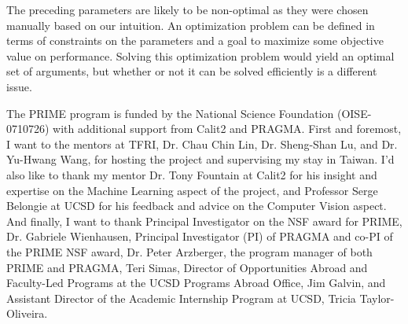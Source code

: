\documentclass[a4paper,12pt]{article}
\begin{document}
The preceding parameters are likely to be non-optimal as they were chosen manually based on our intuition. An optimization problem can be defined in terms of constraints on the parameters and a goal to maximize some objective value on performance. Solving this optimization problem would yield an optimal set of arguments, but whether or not it can be solved efficiently is a different issue.

The PRIME program is funded by the National Science Foundation (OISE-0710726) with additional support from Calit2 and PRAGMA. First and foremost, I want to the mentors at TFRI, Dr. Chau Chin Lin, Dr. Sheng-Shan Lu, and Dr. Yu-Hwang Wang, for hosting the project and supervising my stay in Taiwan. I'd also like to thank my mentor Dr. Tony Fountain at Calit2 for his insight and expertise on the Machine Learning aspect of the project, and Professor Serge Belongie at UCSD for his feedback and advice on the Computer Vision aspect. And finally, I want to thank Principal Investigator on the NSF award for PRIME, Dr. Gabriele Wienhausen, Principal Investigator (PI) of PRAGMA and co-PI of the PRIME NSF award, Dr. Peter Arzberger, the program manager of both PRIME and PRAGMA, Teri Simas, Director of Opportunities Abroad and Faculty-Led Programs at the UCSD Programs Abroad Office, Jim Galvin, and Assistant Director of the Academic Internship Program at UCSD, Tricia Taylor-Oliveira.




\end{document}
